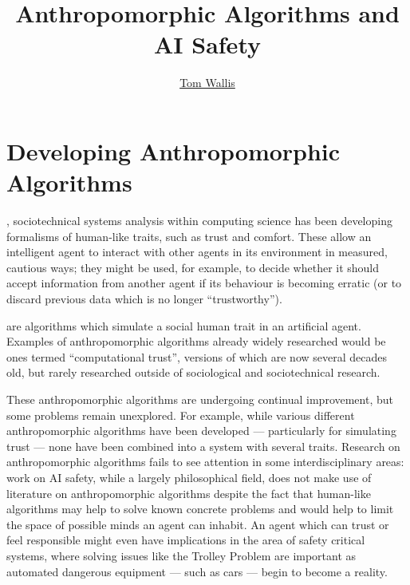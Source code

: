 
\title{Anthropomorphic Algorithms and AI Safety}
\author[Tom Wallis]{\href{http://tom.coffee/}{Tom Wallis}}



\maketitle

\section{Developing Anthropomorphic Algorithms}

, sociotechnical systems analysis within computing science has been developing formalisms of human-like traits, such as trust and comfort. These allow an intelligent agent to interact with other agents in its environment in measured, cautious ways; they might be used, for example, to decide whether it should accept information from another agent if its behaviour is becoming erratic (or to discard previous data which is no longer ``trustworthy'').\par

 are algorithms which simulate a social human trait in an artificial agent. Examples of anthropomorphic algorithms already widely researched would be ones termed ``computational trust'', versions of which are now several decades old\cite{marsh1994}, but rarely researched outside of sociological and sociotechnical research.\par
These anthropomorphic algorithms are undergoing continual improvement\cite{kramdi, Urbano2014}, but some problems remain unexplored. For example, while various different anthropomorphic algorithms have been developed --- particularly for simulating trust --- none have been combined into a system with several traits. Research on anthropomorphic algorithms fails to see attention in some interdisciplinary areas: work on AI safety, while a largely philosophical field, does not make use of literature on anthropomorphic algorithms despite the fact that human-like algorithms may help to solve known concrete problems\cite{concrete_problems} and would help to limit the space of possible minds an agent can inhabit.\cite{sloman_spaceofminds} An agent which can trust or feel responsible might even have implications in the area of safety critical systems, where solving issues like the Trolley Problem are important as automated dangerous equipment --- such as cars --- begin to become a reality.\par

